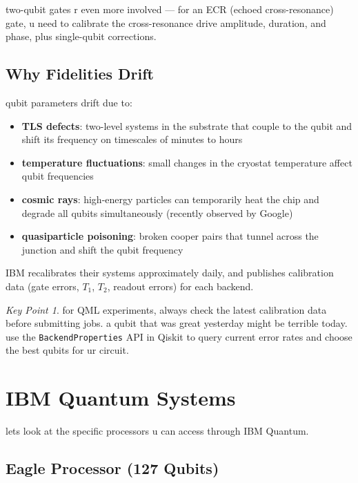 \documentclass[11pt,a4paper]{article}
\theoremstyle{definition}
\theoremstyle{remark}
\newtheorem*{keypoint}{Key Point}
\begin{document}
two-qubit gates r even more involved --- for an ECR (echoed cross-resonance) gate, u need to calibrate the cross-resonance drive amplitude, duration, and phase, plus single-qubit corrections.

\subsection{Why Fidelities Drift}

qubit parameters drift due to:
\begin{itemize}[leftmargin=*]
    \item \textbf{TLS defects}: two-level systems in the substrate that couple to the qubit and shift its frequency on timescales of minutes to hours
    \item \textbf{temperature fluctuations}: small changes in the cryostat temperature affect qubit frequencies
    \item \textbf{cosmic rays}: high-energy particles can temporarily heat the chip and degrade all qubits simultaneously (recently observed by Google)
    \item \textbf{quasiparticle poisoning}: broken cooper pairs that tunnel across the junction and shift the qubit frequency
\end{itemize}

IBM recalibrates their systems approximately daily, and publishes calibration data (gate errors, $T_1$, $T_2$, readout errors) for each backend.

\begin{keypoint}
for QML experiments, always check the latest calibration data before submitting jobs. a qubit that was great yesterday might be terrible today. use the \texttt{BackendProperties} API in Qiskit to query current error rates and choose the best qubits for ur circuit.
\end{keypoint}

\section{IBM Quantum Systems}

lets look at the specific processors u can access through IBM Quantum.

\subsection{Eagle Processor (127 Qubits)}
\end{document}

